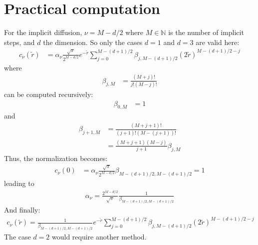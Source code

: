 \documentclass[12pt]{scrartcl}
\begin{document}
\section{Practical computation}
For the implicit diffusion, $\nu = M-d/2$ where $M \in \mathbb{N}$ is the number of implicit steps, and $d$ the dimension. So only the cases $d=1$ and $d=3$ are valid here:
\begin{align}
c_\nu(\tilde{r}) & = \alpha_\nu \frac{\sqrt{\pi}}{2^{M-d/2}} e^{-\tilde{r}} \sum_{j=0}^{M-(d+1)/2} \beta_{j,M-(d+1)/2} (2\tilde{r})^{M-(d+1)/2-j}
\end{align}
where
\begin{align}
\beta_{j,M} & = \frac{\left(M+j\right)!}{j!\left(M-j\right)!}
\end{align}
can be computed recursively:
\begin{align}
\beta_{0,M} & = 1
\end{align}
and
\begin{align}
\beta_{j+1,M} & = \frac{\left(M+j+1\right)!}{(j+1)!\left(M-(j+1)\right)!} \\
& = \frac{(M+j+1)(M-j)}{j+1} \beta_{j,M}
\end{align}
Thus, the normalization becomes:
\begin{align}
c_\nu(0) & = \alpha_\nu \frac{\sqrt{\pi}}{2^{M-d/2}} \beta_{M-(d+1)/2,M-(d+1)/2} = 1
\end{align}
leading to
\begin{align}
\alpha_\nu = \frac{2^{M-d/2}}{\sqrt{\pi}} \frac{1}{\beta_{M-(d+1)/2,M-(d+1)/2}}
\end{align}
And finally:
\begin{align}
c_\nu(\tilde{r}) = \frac{1}{\beta_{M-(d+1)/2,M-(d+1)/2}} e^{-\tilde{r}} \sum_{j=0}^{M-(d+1)/2} \beta_{j,M-(d+1)/2} (2\tilde{r})^{M-(d+1)/2-j}
\end{align}
The case $d=2$ would require another method.



\end{document}

